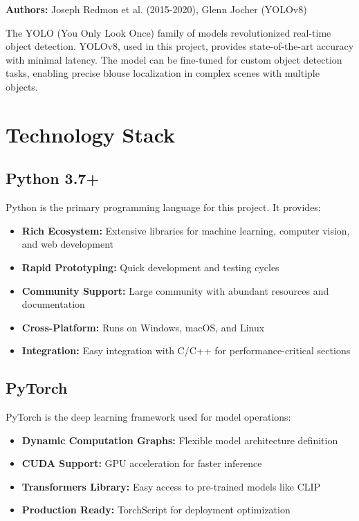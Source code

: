 \documentclass[12pt,a4paper]{report}
\begin{document}
\textbf{Authors:} Joseph Redmon et al. (2015-2020), Glenn Jocher (YOLOv8)

The YOLO (You Only Look Once) family of models revolutionized real-time object detection. YOLOv8, used in this project, provides state-of-the-art accuracy with minimal latency. The model can be fine-tuned for custom object detection tasks, enabling precise blouse localization in complex scenes with multiple objects.

\section{Technology Stack}

\subsection{Python 3.7+}

Python is the primary programming language for this project. It provides:

\begin{itemize}
    \item \textbf{Rich Ecosystem:} Extensive libraries for machine learning, computer vision, and web development
    \item \textbf{Rapid Prototyping:} Quick development and testing cycles
    \item \textbf{Community Support:} Large community with abundant resources and documentation
    \item \textbf{Cross-Platform:} Runs on Windows, macOS, and Linux
    \item \textbf{Integration:} Easy integration with C/C++ for performance-critical sections
\end{itemize}

\subsection{PyTorch}

PyTorch is the deep learning framework used for model operations:

\begin{itemize}
    \item \textbf{Dynamic Computation Graphs:} Flexible model architecture definition
    \item \textbf{CUDA Support:} GPU acceleration for faster inference
    \item \textbf{Transformers Library:} Easy access to pre-trained models like CLIP
    \item \textbf{Production Ready:} TorchScript for deployment optimization
\end{itemize}
\end{document}
